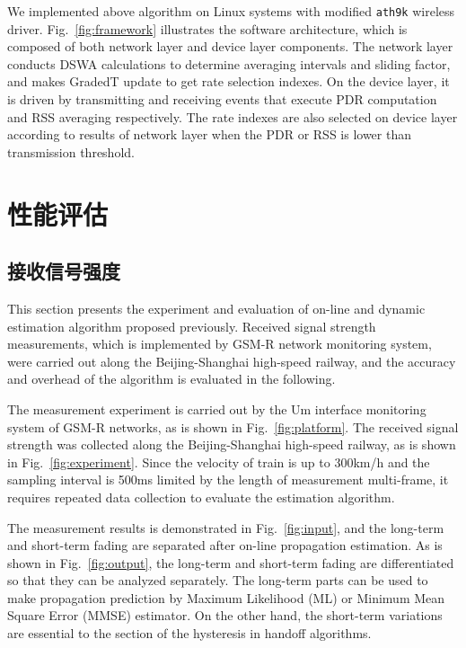 We implemented above algorithm on Linux systems with modified \texttt{ath9k} wireless driver. Fig.~\ref{fig:framework} illustrates the software architecture, which is composed of both network layer and device layer components. The network layer conducts DSWA calculations to determine averaging intervals and sliding factor, and makes GradedT update to get rate selection indexes. On the device layer, it is driven by transmitting and receiving events that execute PDR computation and RSS averaging respectively. The rate indexes are also selected on device layer according to results of network layer when the PDR or RSS is lower than transmission threshold.

\section{性能评估}
\label{chap:evaluation}

\subsection{接收信号强度}
\label{sec:rss}

This section presents the experiment and evaluation of on-line and dynamic estimation algorithm proposed previously. Received signal strength measurements, which is implemented by GSM-R network monitoring system, were carried out along the Beijing-Shanghai high-speed railway, and the accuracy and overhead of the algorithm is evaluated in the following.

The measurement experiment is carried out by the Um interface monitoring system of GSM-R networks, as is shown in Fig.~\ref{fig:platform}. The received signal strength was collected along the Beijing-Shanghai high-speed railway, as is shown in Fig.~\ref{fig:experiment}. Since the velocity of train is up to 300km/h and the sampling interval is 500ms limited by the length of measurement multi-frame, it requires repeated data collection to evaluate the estimation algorithm.


The measurement results is demonstrated in Fig.~\ref{fig:input}, and the long-term and short-term fading are separated after on-line propagation estimation. As is shown in Fig.~\ref{fig:output}, the long-term and short-term fading are differentiated so that they can be analyzed separately. The long-term parts can be used to make propagation prediction by Maximum Likelihood (ML) or Minimum Mean Square Error (MMSE) estimator. On the other hand, the short-term variations are essential to the section of the hysteresis in handoff algorithms.

